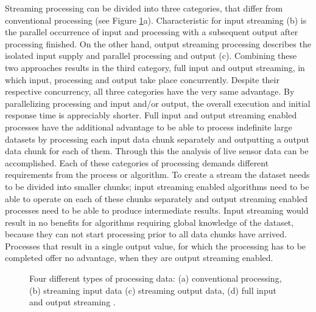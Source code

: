 	Streaming processing can be divided into three categories, that differ from conventional processing (see Figure \ref{fig:streaming}a). Characteristic for input streaming (b) is the parallel occurrence of input and processing with a subsequent output after processing finished. On the other hand, output streaming processing describes the isolated input supply and parallel processing and output (c). Combining these two approaches results in the third category, full input and output streaming, in which input, processing and output take place concurrently. Despite their respective concurrency, all three categories have the very same advantage. By parallelizing processing and input and/or output, the overall execution and initial response time is appreciably shorter. Full input and output streaming enabled processes have the additional advantage to be able to process indefinite large datasets by processing each input data chunk separately and outputting a output data chunk for each of them. Through this the analysis of live sensor data can be accomplished.
	Each of these categories of processing demands different requirements from the process or algorithm. To create a stream the dataset needs to be divided into smaller chunks; input streaming enabled algorithms need to be able to operate on each of these chunks separately and output streaming enabled processes need to be able to produce intermediate results. Input streaming would result in no benefits for algorithms requiring global knowledge of the dataset, because they can not start processing prior to all data chunks have arrived. Processes that result in a single output value, for which the processing has to be completed offer no advantage, when they are output streaming enabled.

	\begin{figure}[!htb]
		\centering
		
		\caption{\label{fig:streaming}Four different types of processing data: (a) conventional processing, (b) streaming input data (c) streaming output data, (d) full input and output streaming \citep[based on][]{foerster2012live}.}
	\end{figure}

